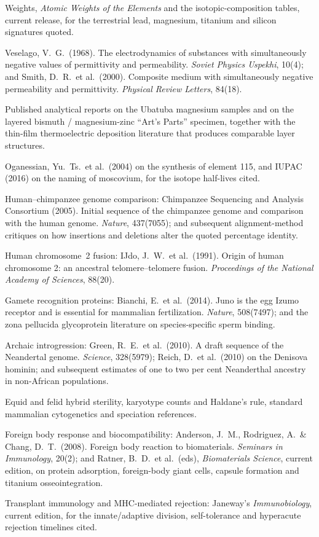 \begin{srcnotes}
Weights, \emph{Atomic Weights of the Elements} and the isotopic-composition tables, current
release, for the terrestrial lead, magnesium, titanium and silicon signatures quoted.
\item Veselago, V.\ G.\ (1968). The electrodynamics of substances with simultaneously negative
values of permittivity and permeability. \emph{Soviet Physics Uspekhi}, 10(4); and Smith, D.\ R.\
et al.\ (2000). Composite medium with simultaneously negative permeability and permittivity.
\emph{Physical Review Letters}, 84(18).
\item Published analytical reports on the Ubatuba magnesium samples and on the layered
bismuth / magnesium-zinc ``Art's Parts'' specimen, together with the thin-film thermoelectric
deposition literature that produces comparable layer structures.
\item Oganessian, Yu.\ Ts.\ et al.\ (2004) on the synthesis of element 115, and IUPAC (2016) on
the naming of moscovium, for the isotope half-lives cited.
\item Human--chimpanzee genome comparison: Chimpanzee Sequencing and Analysis Consortium (2005).
Initial sequence of the chimpanzee genome and comparison with the human genome. \emph{Nature},
437(7055); and subsequent alignment-method critiques on how insertions and deletions alter the
quoted percentage identity.
\item Human chromosome~2 fusion: IJdo, J.\ W.\ et al.\ (1991). Origin of human chromosome 2: an
ancestral telomere--telomere fusion. \emph{Proceedings of the National Academy of Sciences},
88(20).
\item Gamete recognition proteins: Bianchi, E.\ et al.\ (2014). Juno is the egg Izumo receptor and
is essential for mammalian fertilization. \emph{Nature}, 508(7497); and the zona pellucida
glycoprotein literature on species-specific sperm binding.
\item Archaic introgression: Green, R.\ E.\ et al.\ (2010). A draft sequence of the Neandertal
genome. \emph{Science}, 328(5979); Reich, D.\ et al.\ (2010) on the Denisova hominin; and
subsequent estimates of one to two per cent Neanderthal ancestry in non-African populations.
\item Equid and felid hybrid sterility, karyotype counts and Haldane's rule, standard mammalian
cytogenetics and speciation references.
\item Foreign body response and biocompatibility: Anderson, J.\ M., Rodriguez, A.\ \& Chang, D.\ T.\
(2008). Foreign body reaction to biomaterials. \emph{Seminars in Immunology}, 20(2); and Ratner, B.\
D.\ et al.\ (eds), \emph{Biomaterials Science}, current edition, on protein adsorption,
foreign-body giant cells, capsule formation and titanium osseointegration.
\item Transplant immunology and MHC-mediated rejection: Janeway's \emph{Immunobiology}, current
edition, for the innate/adaptive division, self-tolerance and hyperacute rejection timelines cited.

\end{srcnotes}
